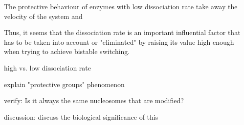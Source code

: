         The protective behaviour of enzymes with low dissociation rate take away the velocity of the system and

        Thus, it seems that the dissociation rate is an important influential factor that has to be taken into account or "eliminated" by raising its value high enough when trying to achieve bistable switching.

        \begin{itemize}
            {
                \color{red}
                \item high vs. low dissociation rate
                \item explain "protective groups" phenomenon
                \item verify: Is it always the same nucleosomes that are modified?
                \item discussion: discuss the biological significance of this
            }
        \end{itemize}
    \newpage

